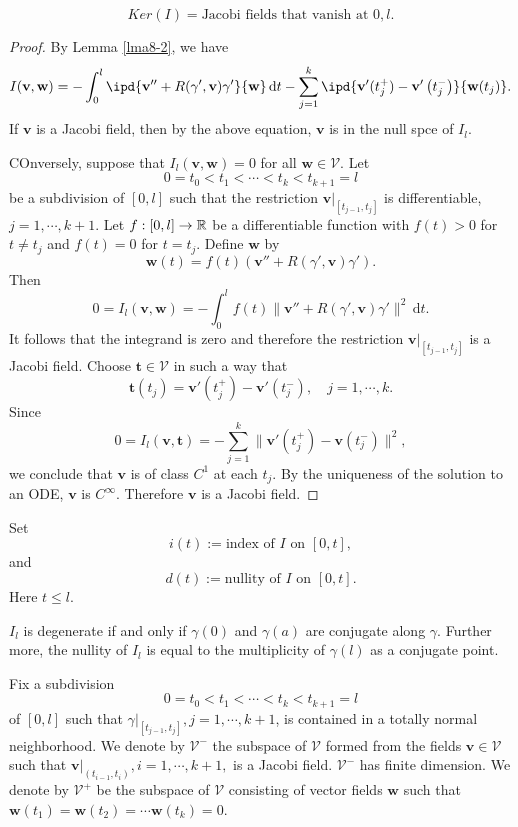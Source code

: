 \begin{proposition}
  \[
    Ker(I)= \text{Jacobi fields that vanish at }0,l.
  \] 
\end{proposition}
\begin{proof}
  By Lemma \ref{lma8-2}, we have 
  \[
    I(\mathbf{v},\mathbf{w})=-\int_0^{l}\ipd{\mathbf{v}''+R(\gamma',\mathbf{v})\gamma'}{\mathbf{w}}\,\mathrm{d}t-\sum_{j=1}^{k} \ipd{\mathbf{v}'(t_{j}^+)-\mathbf{v}'\left( t_{j}^- \right) }{\mathbf{w}(t_j)}.
  \]
  If $\mathbf{v}$ is a Jacobi field, then by the above equation, $\mathbf{v}$ is in the null spce of $I_l$. 
  
  COnversely, suppose that $I_l(\mathbf{v},\mathbf{w})=0$ for all $\mathbf{w}\in \mathcal{V}$. Let 
  \[ 
  0=t_0<t_1<\cdots <t_k<t_{k+1}=l
  \] 
  be a subdivision of $[0,l]$ such that the restriction $\mathbf{v}|_{\left[ t_{j-1},t_j \right] }$ is differentiable, $j=1,\cdots ,k+1$. Let $f:\left[ 0,l \right] \to \mathbb{R}$ be a differentiable function with $f(t)>0$ for $t\neq t_j$ and $f(t)=0$ for $t=t_j$. Define $\mathbf{w}$ by
  \[
    \mathbf{w}(t)=f(t)\left( \mathbf{v}''+R\left( \gamma',\mathbf{v} \right) \gamma' \right) .
  \] 
  Then 
  \[
    0=I_l(\mathbf{v},\mathbf{w})=-\int_0^{l}f(t)\|\mathbf{v}''+R(\gamma',\mathbf{v})\gamma'\|^2\,\mathrm{d}t.
  \] 
  It follows that the integrand is zero and therefore the restriction $\mathbf{v}|_{\left[ t_{j-1},t_j \right] }$ is a Jacobi field. Choose $\mathbf{t}\in \mathcal{V}$ in such a way that
  \[
    \mathbf{t}(t_j)=\mathbf{v}'(t_j^+)-\mathbf{v}'\left( t_{j}^{-} \right) ,\quad j=1,\cdots ,k.
  \] 
  Since 
   \[
     0=I_l(\mathbf{v},\mathbf{t})=-\sum_{j=1}^{k} \|\mathbf{v}'\left( t_j^{+} \right) -\mathbf{v}\left( t_j^{-} \right) \|^2,
  \] 
  we conclude that $\mathbf{v}$ is of class $C^1$ at each $t_j$. By the uniqueness of the solution to an ODE, $\mathbf{v}$ is $C^\infty$. Therefore $\mathbf{v}$ is a Jacobi field.
\end{proof}
  Set 
  \[
    i(t):= \text{index of }I \text{ on }[0,t],
  \] 
  and
  \[
    d(t):= \text{nullity of }I \text{ on }[0,t].
  \] 
  Here $t\le l$.
\begin{corollary}
  $I_l$ is degenerate if and only if $\gamma(0)$ and $\gamma(a)$ are conjugate along $\gamma$. Further more, the nullity of $I_l$ is equal to the multiplicity of $\gamma(l)$ as a conjugate point.
\end{corollary}

Fix a subdivision
\[
0=t_0<t_1<\cdots <t_k<t_{k+1}=l
\] 
of $[0,l]$ such that $\gamma|_{[t_{j-1},t_j]},j=1,\cdots ,k+1$, is contained in a totally normal neighborhood.
We denote by $\mathcal{V}^{-}$ the subspace of $\mathcal{V}$ formed from the fields $\mathbf{v}\in \mathcal{V}$ such that $\mathbf{v} |_{\left( t_{i-1},t_i \right) },i=1,\cdots ,k+1,$ is a Jacobi field. $\mathcal{V}^{-}$ has finite dimension. We denote by $\mathcal{V}^{+}$ be the subspace of $\mathcal{V}$ consisting of vector fields $\mathbf{w}$ such that $\mathbf{w}(t_1)=\mathbf{w}(t_2)=\cdots \mathbf{w}(t_k)=0$.

